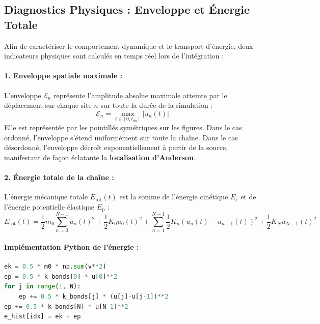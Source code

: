 \documentclass[11pt, a4paper]{report}
\begin{document}
\subsection{Diagnostics Physiques : Enveloppe et Énergie Totale}

Afin de caractériser le comportement dynamique et le transport d'énergie, deux indicateurs physiques sont calculés en temps réel lors de l'intégration :

\paragraph{1. Enveloppe spatiale maximale :}
L'enveloppe $\mathcal{E}_n$ représente l'amplitude absolue maximale atteinte par le déplacement sur chaque site $n$ sur toute la durée de la simulation :
\begin{equation}
    \mathcal{E}_n = \max_{t \in [0, t_{\text{fin}}]} |u_n(t)|
\end{equation}
Elle est représentée par les pointillés symétriques sur les figures. Dans le cas ordonné, l'enveloppe s'étend uniformément sur toute la chaîne. Dans le cas désordonné, l'enveloppe décroît exponentiellement à partir de la source, manifestant de façon éclatante la \textbf{localisation d'Anderson}.

\paragraph{2. Énergie totale de la chaîne :}
L'énergie mécanique totale $E_{\text{tot}}(t)$ est la somme de l'énergie cinétique $E_{\text{c}}$ et de l'énergie potentielle élastique $E_{\text{p}}$ :
\begin{equation}
    E_{\text{tot}}(t) = \frac{1}{2} m_0 \sum_{n=0}^{N-1} \dot{u}_n(t)^2 + \frac{1}{2} K_0 u_0(t)^2 + \sum_{n=1}^{N-1} \frac{1}{2} K_n \left(u_n(t) - u_{n-1}(t)\right)^2 + \frac{1}{2} K_N u_{N-1}(t)^2
\end{equation}

\paragraph{Implémentation Python de l'énergie :}
\begin{lstlisting}[language=Python]
ek = 0.5 * m0 * np.sum(v**2)
ep = 0.5 * k_bonds[0] * u[0]**2
for j in range(1, N): 
    ep += 0.5 * k_bonds[j] * (u[j]-u[j-1])**2
ep += 0.5 * k_bonds[N] * u[N-1]**2
e_hist[idx] = ek + ep
\end{lstlisting}
\end{document}
